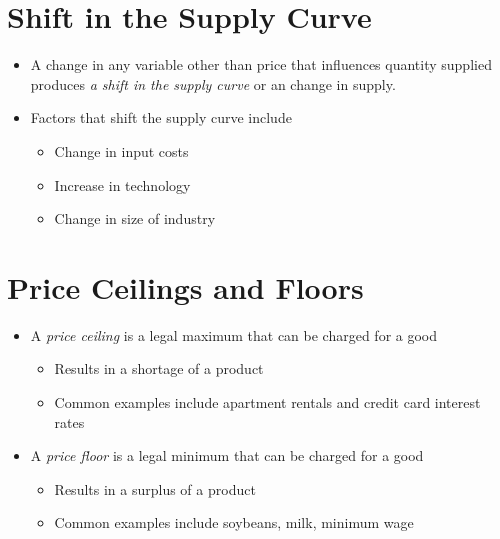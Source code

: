 \documentclass[11pt]{article}
\begin{document}
\section*{Shift in the Supply Curve}
\label{sec:org9e6f686}
\begin{itemize}
\item A change in any variable other than price that influences quantity supplied produces \emph{a shift in the supply curve} or an change in supply.
\item Factors that shift the supply curve include
\begin{itemize}
\item Change in input costs
\item Increase in technology
\item Change in size of industry
\end{itemize}
\end{itemize}

\section*{Price Ceilings and Floors}
\label{sec:orged67885}
\begin{itemize}
\item A \emph{price ceiling} is a legal maximum that can be charged for a good
\begin{itemize}
\item Results in a shortage of a product
\item Common examples include apartment rentals and credit card interest rates
\end{itemize}
\item A \emph{price floor} is a legal minimum that can be charged for a good
\begin{itemize}
\item Results in a surplus of a product
\item Common examples include soybeans, milk, minimum wage
\end{itemize}
\end{itemize}
\end{document}
